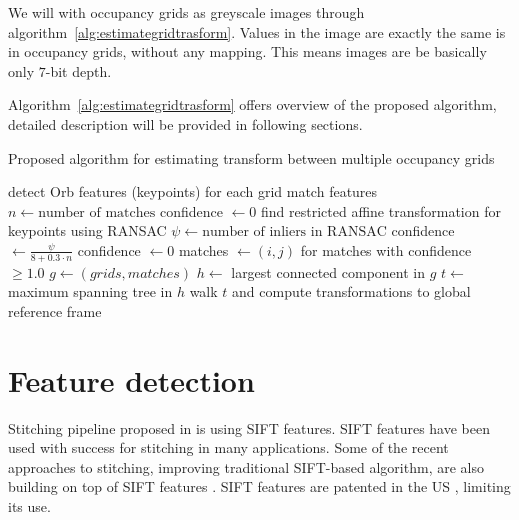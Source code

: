 We will with occupancy grids as greyscale images through algorithm~\ref{alg:estimategridtrasform}. Values in the image are exactly the same is in occupancy grids, without any mapping. This means images are be basically only $7$-bit depth.

Algorithm~\ref{alg:estimategridtrasform} offers overview of the proposed algorithm, detailed description will be provided in following sections.

\begin{algorithm}
    \caption{Proposed algorithm for estimating transform between multiple occupancy grids}
    \label{alg:estimategridtrasform}
    \begin{algorithmic}[1]
            \State detect Orb features (keypoints) for each grid
             
            	\State match features
            	\State $n \gets \text{number of matches}$
            		\State confidence $\gets 0$
            	\Else
            		\State find restricted affine transformation for keypoints using RANSAC
            		\State $\psi \gets \text{number of inliers in RANSAC}$
            			\State confidence $\gets \frac{\psi}{8 + 0.3 \cdot n}$
            		\Else
            			\State confidence $\gets 0$
            		\EndIf
            	\EndIf
            \EndFor
            \State matches $\gets (i,j)$ for matches with confidence $\ge 1.0$
            \State $g \gets (grids, matches)$
            \State $h \gets$ largest connected component in $g$
            \State $t \gets$ maximum spanning tree in $h$
            \State walk $t$ and compute transformations to global reference frame
        \EndProcedure
    \end{algorithmic}
\end{algorithm}


\section{Feature detection} %
\label{sec:feature_detection}

Stitching pipeline proposed in \cite{Brown2006} is using SIFT features. SIFT features have been used with success for stitching in many applications. Some of the recent approaches to stitching, improving traditional SIFT-based algorithm, are also building on top of SIFT features \cite{Xie2015}. SIFT features are patented in the US \cite{lowe2004method}, limiting its use.

